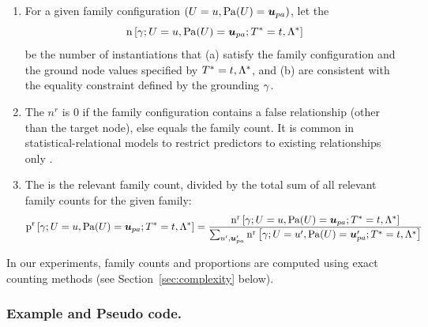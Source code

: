 \documentclass[runningheads,a4paper]{llncs}
\renewcommand{\Qconj}{\Appendterm{\FG{\TT} = \TV} {\QC}} %
\begin{document}
\begin{enumerate}
\item For a given family configuration $(\Appendterm{\UT  = \UV} {\Pa{\UT} = \Prange{\UT}})$, let the  $$\Count{\Appendterm{\grounding;\UT  = \UV} {\Pa{\UT} = \Prange{\UT}}} {\Qconj}$$ be the number of instantiations that (a) satisfy the family configuration and the ground node values specified by $\Qconj$, and (b) are consistent with the equality constraint defined by the grounding $\gamma$.
\item The  $n^{r}$ is 0 if the family configuration contains a false relationship (other than the target node), else equals the family count. It is common in statistical-relational models to restrict predictors to existing relationships only \cite{Getoor2007c,Russell2010}.
\item The  is the relevant family count, divided by the total sum of all relevant family counts for the given family:
{\scriptsize
\begin{equation} \notag
 \Relfreq{\Appendterm{\grounding;\UT  = \UV} {\Pa{\UT} = \Prange{\UT}}} {\Qconj} = \frac
 {\Relcount{\Appendterm{\grounding;\UT  = \UV} {\Pa{\UT} = \Prange{\UT}}} {\Qconj}}
 {\sum_{\UV',\Prange{\UT}'}\Relcount{\Appendterm{\grounding;\UT  = \UV'} {\Pa{\UT} = \Prange{\UT}'}} {\Qconj}
 }
\end{equation}
}
\end{enumerate}

In our experiments, family counts and proportions are computed using exact counting methods (see Section~\ref{sec:complexity} below). 



\subsubsection{Example and Pseudo code.}
\end{document}

